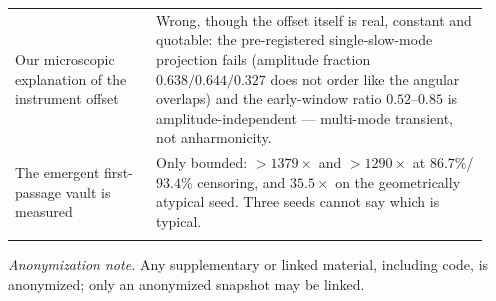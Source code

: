 \documentclass{article}
\begin{document}
{\begin{center}
\begin{tabular}{p{0.28\linewidth}p{0.66\linewidth}}
Our microscopic explanation of the instrument offset & Wrong, though the offset itself is real, constant and quotable: the pre-registered single-slow-mode projection fails (amplitude fraction $0.638/0.644/0.327$ does not order like the angular overlaps) and the early-window ratio $0.52$--$0.85$ is amplitude-independent --- multi-mode transient, not anharmonicity.\\
The emergent first-passage vault is measured & Only bounded: $>1379\times$ and $>1290\times$ at $86.7\%$/$93.4\%$ censoring, and $35.5\times$ on the geometrically atypical seed. Three seeds cannot say which is typical.\\\\
\bottomrule
\end{tabular}
\end{center}\par}

\emph{Anonymization note.} Any supplementary or linked material, including code, is anonymized; only an anonymized snapshot may be linked.
\end{document}
